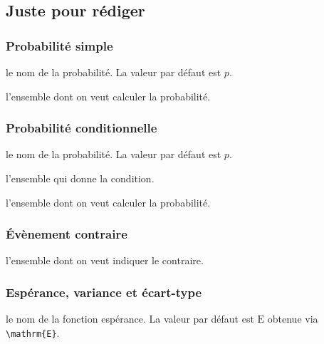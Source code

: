 \documentclass[12pt,a4paper]{article}
\theoremstyle{definition}
\newcommand\extraspace{
    \vspace{0.25em}
}
\begin{document}
\subsection{Juste pour rédiger}

\subsubsection{Probabilité \og simple \fg}




\IDoption{} le nom de la probabilité. La valeur par défaut est $p$.

\IDarg{} l'ensemble dont on veut calculer la probabilité.




\subsubsection{Probabilité conditionnelle}





\extraspace




\IDoption{} le nom de la probabilité. La valeur par défaut est $p$.

 l'ensemble qui donne la condition.

 l'ensemble dont on veut calculer la probabilité.


\subsubsection{Évènement contraire}




\IDarg{} l'ensemble dont on veut indiquer le contraire.


\subsubsection{Espérance, variance et écart-type}




\IDoption{} le nom de la fonction espérance. La valeur par défaut est $\mathrm{E}$ obtenue via \verb#\mathrm{E}#.
\end{document}
